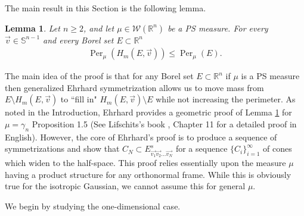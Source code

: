 \documentclass[12pt]{amsart}
\numberwithin{equation}{section}
\theoremstyle{plain}
\newtheorem{lemma}[theorem]{Lemma}
\theoremstyle{definition}
\begin{document}
The main result in this Section is the following lemma.

\begin{lemma}\label{l:H are minimal}
    Let $n \ge 2$, and let $\mu \in \mathscr{W}(\mathbb{R}^n)$ be a PS measure. For every $\vec{v} \in \mathbb{S}^{n-1}$ and every Borel set $E \subset \mathbb{R}^n$
    \begin{align*}
    \operatorname{Per}_{\mu}(H_m(E,\vec{v})) \le \operatorname{Per}_{\mu}(E).
    \end{align*}    
\end{lemma}

The main idea of the proof is that for any Borel set $E \subset \mathbb{R}^n$ if $\mu$ is a PS measure then generalized Ehrhard symmetrization allows us to move mass from $E \setminus H_{m}(E, \vec{v})$ to ``fill in" $H_m(E, \vec{v}) \setminus E$ while not increasing the perimeter.  As noted in the Introduction, Ehrhard provides a geometric proof of Lemma \ref{l:H are minimal} for $\mu = \gamma_n$ \cite{Ehrhard83} Proposition 1.5 (See Lifschits's book \cite{lifshits1995gaussian}, Chapter 11 for a detailed proof in English).  However, the core of Ehrhard's proof is to produce a sequence of symmetrizations and show that $C_N \subset E^s_{\vec{v_1}\vec{v_2}...\vec{v_N}}$ for a sequence $\{C_i\}_{i=1}^{\infty}$ of cones which widen to the half-space.  This proof relies essentially upon the measure $\mu$ having a product structure for any orthonormal frame. While this is obviously true for the isotropic Gaussian, we cannot assume this for general $\mu$.

We begin by studying the one-dimensional case. 
\end{document}
